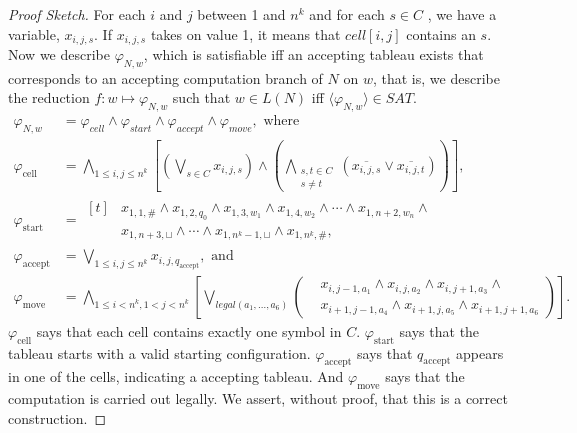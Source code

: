 \begin{proof}[Proof Sketch]
  For each $i$ and $j$ between 1 and $n^k$ and for each $s\in C$ , we have a variable, $x_{i,j,s}$. If $x_{i,j,s}$ takes on value 1, it means that $cell[i,j]$ contains an $s$. Now we describe $\varphi_{N,w}$, which is satisfiable iff an accepting tableau exists that corresponds to an accepting computation branch of $N$ on $w$, that is, we describe the reduction $f:w\mapsto \varphi_{N,w}$ such that $w\in L(N)$ iff $\langle \varphi_{N,w}\rangle\in \mathit{SAT}$.
  \begin{align*}
    \varphi_{N,w}           & =\varphi_{cell}\wedge \varphi_{start}\wedge \varphi_{accept}\wedge \varphi_{move},\text{ where}           \\
    \varphi_{\text{cell}}   & =
    \bigwedge_{1 \leq i,j \leq n^k}
    \left[
      \left( \bigvee_{s \in C} x_{i,j,s} \right)
      \land
    \left( \bigwedge_{\substack{s,t \in C                                                                                               \\ s \ne t}} (\overline{x_{i,j,s}} \lor \overline{x_{i,j,t}}) \right)
    \right],                                                                                                                            \\
    \varphi_{\text{start}}  & =
    \begin{aligned}[t]
       & x_{1,1,\#} \land x_{1,2,q_0} \land x_{1,3,w_1} \land x_{1,4,w_2} \land \cdots \land x_{1,n+2,w_n} \land \\
       & x_{1,n+3,\sqcup} \land \cdots \land x_{1,n^k-1,\sqcup} \land x_{1,n^k,\#},
    \end{aligned}                          \\
    \varphi_{\text{accept}} & =
    \bigvee_{1 \leq i,j \leq n^k}x_{i,j,q_{\text{accept}}},                                                                 \text{ and} \\
    \varphi_{\text{move}}   & =\bigwedge_{1\leq i<n^k,1<j<n^k}\left[
      \bigvee_{
        legal(a_1,\dots,a_6)
      }\left(
      \begin{aligned}
           & x_{i,j-1,a_1}\wedge x_{i,j,a_2}\wedge x_{i,j+1,a_3}       \wedge \\
           & x_{i+1,j-1,a_4}\wedge x_{i+1,j,a_5}\wedge x_{i+1,j+1,a_6}
        \end{aligned}
      \right)
      \right].
  \end{align*}
  $\varphi_{\text{cell}}$ says that each cell contains exactly one symbol in $C$. $\varphi_{\text{start}}$ says that the tableau starts with a valid starting configuration. $\varphi_{\text{accept}}$ says that $q_{\text{accept}}$ appears in one of the cells, indicating a accepting tableau. And $\varphi_{\text{move}}$ says that the computation is carried out legally. We assert, without proof, that this is a correct construction.
\end{proof}

